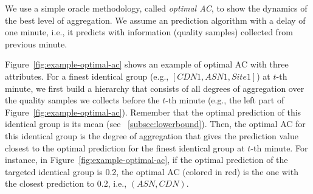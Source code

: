 We use a simple oracle methodology, called {\it optimal AC}, to show the dynamics of the best level of aggregation. We assume an prediction algorithm with a delay of one minute, i.e., it predicts with information (quality samples) collected from previous minute.

Figure~\ref{fig:example-optimal-ac} shows an example of optimal AC with three attributes. For a finest identical group (e.g., $[CDN1,ASN1,Site1]$) at $t$-th minute, we first build a hierarchy that consists of all degrees of aggregation over the quality samples we collects before the $t$-th minute (e.g., the left part of Figure~\ref{fig:example-optimal-ac}). 
Remember that the optimal prediction of this identical group is its mean (see \Section~\ref{subsec:lowerbound}). 
Then, the optimal AC for this identical group is the degree of aggregation that gives the prediction value closest to the optimal prediction for the finest identical group at $t$-th minute. 
For instance, in Figure~\ref{fig:example-optimal-ac}, if the optimal prediction of the targeted identical group is 0.2, the optimal AC (colored in red) is the one with the closest prediction to 0.2, i.e., $(ASN, CDN)$. 


\begin{figure}[h!]
\centering
{}
\hspace{-0.6cm}
\label{fig:optimal-ac-dynamics}
\end{figure}


